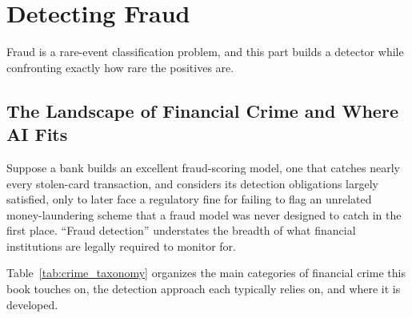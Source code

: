 \documentclass[../ai_in_finance]{subfiles}
\begin{document}
\section{Detecting Fraud}

Fraud is a rare-event classification problem, and this part builds a detector while confronting exactly how rare the positives are.

\subsection{The Landscape of Financial Crime and Where AI Fits}
\label{sec:crime-taxonomy}

Suppose a bank builds an excellent fraud-scoring model, one that catches nearly every stolen-card transaction, and considers its detection obligations largely satisfied, only to later face a regulatory fine for failing to flag an unrelated money-laundering scheme that a fraud model was never designed to catch in the first place. ``Fraud detection'' understates the breadth of what financial institutions are legally required to monitor for.

Table~\ref{tab:crime_taxonomy} organizes the main categories of financial crime this book touches on, the detection approach each typically relies on, and where it is developed.
\end{document}

